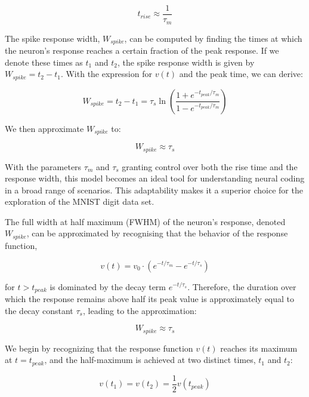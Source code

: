 \begin{equation}
t_{rise} \approx \frac{1}{\tau_m}
\end{equation}

The spike response width, $W_{spike}$, can be computed by finding the times at which the neuron's response reaches a certain fraction of the peak response. If we denote these times as $t_1$ and $t_2$, the spike response width is given by $W_{spike} = t_2 - t_1$. With the expression for $v(t)$ and the peak time, we can derive:

\begin{equation}
W_{spike} = t_2 - t_1 = \tau_s \ln\left(\frac{1 + e^{-t_{peak}/\tau_m}}{1 - e^{-t_{peak}/\tau_m}}\right)
\end{equation}

We then approximate $W_{spike}$ to:

\begin{equation}
W_{spike} \approx \tau_s
\end{equation}



With the parameters $\tau_m$ and $\tau_s$ granting control over both the rise time and the response width, this model becomes an ideal tool for understanding neural coding in a broad range of scenarios. This adaptability makes it a superior choice for the exploration of the MNIST digit data set.

The full width at half maximum (FWHM) of the neuron's response, denoted $W_{spike}$, can be approximated by recognising that the behavior of the response function,

\begin{equation}
v(t) = v_0 \cdot (e^{-t/\tau_m} - e^{-t/\tau_s})
\end{equation}

for $t > t_{peak}$ is dominated by the decay term $e^{-t/\tau_s}$. Therefore, the duration over which the response remains above half its peak value is approximately equal to the decay constant $\tau_s$, leading to the approximation:

\begin{equation}
W_{spike} \approx \tau_s
\end{equation}




We begin by recognizing that the response function $v(t)$ reaches its maximum at $t = t_{peak}$, and the half-maximum is achieved at two distinct times, $t_1$ and $t_2$:

\begin{equation}
v(t_1) = v(t_2) = \frac{1}{2} v(t_{peak})
\end{equation}


